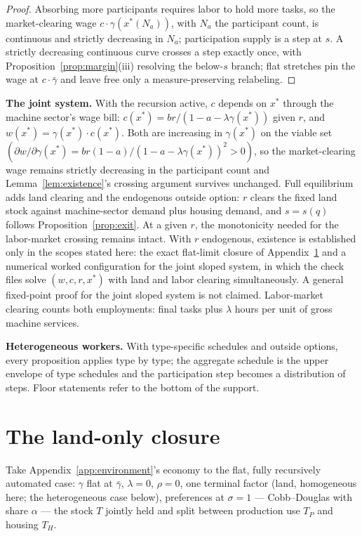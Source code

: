 \documentclass[12pt]{article}
\theoremstyle{plain}
\begin{document}
\begin{proof}
Absorbing more participants requires labor to hold more tasks, so the market-clearing wage $c\cdot \gamma (x^*(N_a))$, with $N_a$ the participant count, is continuous and strictly decreasing in $N_a$; participation supply is a step at $s$. A strictly decreasing continuous curve crosses a step exactly once, with Proposition~\ref{prop:margin}(iii) resolving the below-$s$ branch; flat stretches pin the wage at $c\cdot \bar{\gamma}$ and leave free only a measure-preserving relabeling.
\end{proof}

\textbf{The joint system.} With the recursion active, $c$ depends on $x^*$ through the machine sector's wage bill: $c(x^*) = br/(1 - a - \lambda \gamma (x^*))$ given $r$, and $w(x^*) = \gamma (x^*)\cdot c(x^*)$. Both are increasing in $\gamma (x^*)$ on the viable set $(\partial w/\partial \gamma (x^*) = br(1-a)/(1-a-\lambda \gamma (x^*))^2 > 0)$, so the market-clearing wage remains strictly decreasing in the participant count and Lemma~\ref{lem:existence}'s crossing argument survives unchanged. Full equilibrium adds land clearing and the endogenous outside option: $r$ clears the fixed land stock against machine-sector demand plus housing demand, and $s=s(q)$ follows Proposition~\ref{prop:exit}. At a given $r$, the monotonicity needed for the labor-market crossing remains intact. With $r$ endogenous, existence is established only in the scopes stated here: the exact flat-limit closure of Appendix~\ref{app:landonly} and a numerical worked configuration for the joint sloped system, in which the check files solve $(w,c,r,x^*)$ with land and labor clearing simultaneously. A general fixed-point proof for the joint sloped system is not claimed. Labor-market clearing counts both employments: final tasks plus $\lambda$ hours per unit of gross machine services.

\textbf{Heterogeneous workers.} With type-specific schedules and outside options, every proposition applies type by type; the aggregate schedule is the upper envelope of type schedules and the participation step becomes a distribution of steps. Floor statements refer to the bottom of the support.

\section{The land-only closure}\label{app:landonly}

Take Appendix~\ref{app:environment}'s economy to the flat, fully recursively automated case: $\gamma$ flat at $\bar{\gamma}$, $\lambda=0$, $\rho=0$, one terminal factor (land, homogeneous here; the heterogeneous case below), preferences at $\sigma = 1$ --- Cobb--Douglas with share $\alpha$ --- the stock $T$ jointly held and split between production use $T_P$ and housing $T_H$.
\end{document}
